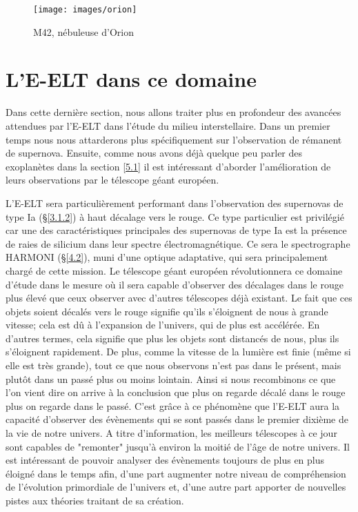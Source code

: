 \begin{figure}[H]
	\centering
	\texttt{[image: images/orion]}
	\caption[M42, nébuleuse d'Orion - astrophoto prise par René Lemoine en 2018 avec une lunette TS APO 80 et une caméra QHY10 (5 heures de pose)]{M42, nébuleuse d'Orion}
	\label{Fig. 5.1}
\end{figure}\bigskip



\section{ L'E-ELT dans ce domaine}\label{5.2}

Dans cette dernière section, nous allons traiter plus en profondeur des avancées attendues par l'E-ELT dans l'étude du milieu interstellaire. Dans un premier temps nous nous attarderons plus spécifiquement sur l'observation de rémanent de supernova. Ensuite, comme nous avons déjà quelque peu parler des exoplanètes dans la section \ref{5.1} il est intéressant d'aborder l'amélioration de leurs observations par le télescope géant européen.\medskip

L'E-ELT sera particulièrement performant dans l'observation des supernovas de type Ia (§\ref{3.1.2}) à haut décalage vers le rouge. Ce type particulier est privilégié car une des caractéristiques principales des supernovas de type Ia est la présence de raies de silicium dans leur spectre électromagnétique. Ce sera le spectrographe HARMONI (§\ref{4.2}), muni d'une optique adaptative, qui sera principalement chargé de cette mission. Le télescope géant européen révolutionnera ce domaine d'étude dans le mesure où il sera capable d'observer des décalages dans le rouge plus élevé que ceux observer avec d'autres télescopes déjà existant. Le fait que ces objets soient décalés vers le rouge signifie qu'ils s'éloignent de nous à grande vitesse; cela est dû à l'expansion de l'univers, qui de plus est accélérée. En d'autres termes, cela signifie que plus les objets sont distancés de nous, plus ils s'éloignent rapidement. De plus, comme la vitesse de la lumière est finie (même si elle est très grande), tout ce que nous observons n'est pas dans le présent, mais plutôt dans un passé plus ou moins lointain. Ainsi si nous recombinons ce que l'on vient dire on arrive à la conclusion que plus on regarde décalé dans le rouge plus on regarde dans le passé. C'est grâce à ce phénomène que l'E-ELT aura la capacité d'observer des évènements qui se sont passés dans le premier dixième de la vie de notre univers. A titre d'information, les meilleurs télescopes à ce jour sont capables de "remonter" jusqu'à environ la moitié de l'âge de notre univers. Il est intéressant de pouvoir analyser des évènements toujours de plus en plus éloigné dans le temps afin, d'une part augmenter notre niveau de compréhension de l'évolution primordiale de l'univers et, d'une autre part apporter de nouvelles pistes aux théories traitant de sa création.\medskip

